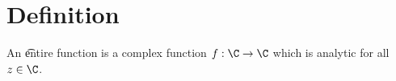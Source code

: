 
\section*{Definition}

An \t{entire function} is a complex function $f: \C  \to \C $ which is analytic for all $z \in \C $.

\blankpage